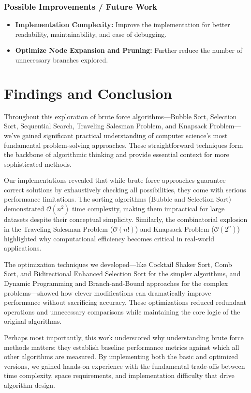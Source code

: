\documentclass{article}
\begin{document}
\subsubsection*{Possible Improvements / Future Work}    
\begin{itemize}
    \item \textbf{Implementation Complexity:} Improve the implementation for better readability, maintainability, and ease of debugging.
    \item \textbf{Optimize Node Expansion and Pruning:} Further reduce the number of unnecessary branches explored.
\end{itemize}


\clearpage
\section{Findings and Conclusion}
\hspace{.2in}Throughout this exploration of brute force algorithms—Bubble Sort, Selection Sort, Sequential Search, Traveling Salesman Problem, and Knapsack Problem—we've gained significant practical understanding of computer science's most fundamental problem-solving approaches. These straightforward techniques form the backbone of algorithmic thinking and provide essential context for more sophisticated methods.

Our implementations revealed that while brute force approaches guarantee correct solutions by exhaustively checking all possibilities, they come with serious performance limitations. The sorting algorithms (Bubble and Selection Sort) demonstrated $\mathcal{O}(n^2)$ time complexity, making them impractical for large datasets despite their conceptual simplicity. Similarly, the combinatorial explosion in the Traveling Salesman Problem ($\mathcal{O}(n!)$) and Knapsack Problem ($\mathcal{O}(2^n)$) highlighted why computational efficiency becomes critical in real-world applications.

The optimization techniques we developed—like Cocktail Shaker Sort, Comb Sort, and Bidirectional Enhanced Selection Sort for the simpler algorithms, and Dynamic Programming and Branch-and-Bound approaches for the complex problems—showed how clever modifications can dramatically improve performance without sacrificing accuracy. These optimizations reduced redundant operations and unnecessary comparisons while maintaining the core logic of the original algorithms.

Perhaps most importantly, this work underscored why understanding brute force methods matters: they establish baseline performance metrics against which all other algorithms are measured. By implementing both the basic and optimized versions, we gained hands-on experience with the fundamental trade-offs between time complexity, space requirements, and implementation difficulty that drive algorithm design.
\end{document}

